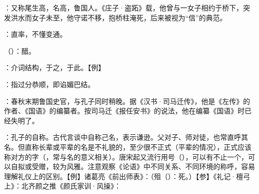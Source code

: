 {
\item {}：又称尾生高，名高，鲁国人。《庄子·盗跖》载，他曾与一女子相约于桥下，突发洪水而女子未至，他守诺不移，抱桥柱淹死，后来被视为“信”的典范。
\item {}：直率，不懂变通。
\item {}（）：醋。
\item {}：介词结构，于之，于此。【例】 
}
{}  %


{
\item {}：指过分恭顺，即谄媚巴结。
\item {}：春秋末期鲁国史官，与孔子同时稍晚。据《汉书·司马迁传》，他是《左传》的作者、《国语》的编纂者。按司马迁《报任安书》的说法，他在编纂《国语》时已经失明了。%

\item {}：孔子的自称。古代言谈中自称己名，表示谦逊。父对子、师对徒，也常直呼其名。但直称长辈或平辈的名是不礼貌的，至少很不正式（平辈的情况），正式应该称对方的字（，常与名的意义相关）。唐宋起又流行用号（），可以有不止一个，可以自拟或受赠，较为风雅。注意观察《论语》中不同关系、不同环境的称呼，容易理解礼仪上的区别。【例】诸葛亮《前出师表》：（殂（）：死。）【参】《礼记·檀弓上》：北齐颜之推《颜氏家训·风操》：
}
{}



